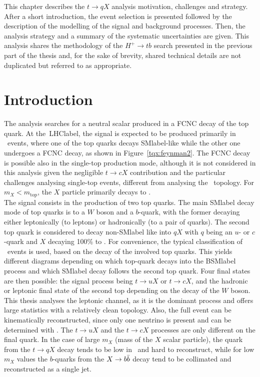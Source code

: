 This chapter describes the $t\to qX$ analysis motivation, challenges and strategy. After a short introduction, the event selection is presented followed by the description of the modelling of the signal and background processes. Then, the analysis strategy and a summary of the systematic uncertainties are given. This analysis shares the methodology of the $H^+\to tb$ search presented in the previous part of the thesis and, for the sake of brevity, shared technical details are not duplicated but referred to as appropriate.

\section{Introduction}

The analysis searches for a neutral scalar produced in a FCNC decay of the top quark. At the~\acrshort{LHClabel}, the signal is expected to be produced primarily in \ttbar\ events, where one of the top quarks decays \acrshort{SMlabel}-like while the other one undergoes a FCNC decay, as shown in Figure~\ref{tqx:feynman2}. The FCNC decay is possible also in the single-top production mode, although it is not considered in this analysis given the negligible $t\to cX$ contribution and the particular challenges analysing single-top events, different from analysing the \ttbar\ topology. For $m_X<m_\text{top}$, the $X$ particle primarily decays to \bbar.\\

The signal consists in the production of two top quarks. The main \acrshort{SMlabel} decay mode of top quarks is to a $W$ boson and a $b$-quark, with the former decaying either leptonically (to leptons) or hadronically (to a pair of quarks). The second top quark is considered to decay non-\acrshort{SMlabel} like into $qX$ with $q$ being an $u$- or $c$-quark and $X$ decaying 100\% to \bbar. For convenience, the typical classification of \ttbar\ events is used, based on the decay of the involved top quarks. This yields different diagrams depending on which top-quark decays into the \acrshort{BSMlabel} process and which \acrshort{SMlabel} decay follows the second top quark. Four final states are then possible: the signal process being $t\to uX$ or $t\to cX$, and the hadronic or leptonic final state of the second top depending on the decay of  the $W$ boson.\\

This thesis analyses the leptonic channel, as it is the dominant process and offers large statistics with a relatively clean topology. Also, the full event can be kinematically reconstructed, since only one neutrino is present and can be determined with \MET. The $t\to uX$ and the $t\to cX$ processes are only different on the final quark. In the case of large $m_X$ (mass of the $X$ scalar particle), the quark from the $t\to qX$ decay tends to be low in \pT\ and hard to reconstruct, while for low $m_X$ values the $b$-quarks from the $X\to b\bar{b}$ decay tend to be collimated and reconstructed as a single jet.\\

